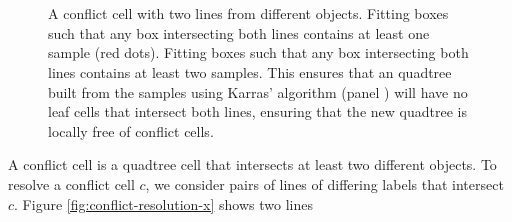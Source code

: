 \documentclass{egpubl}
\begin{document}
\begin{figure}
  \centering
   \\
   \\
  \caption{
    \protect{} A conflict cell with two lines from different objects.
    \protect{} Fitting boxes such that any box intersecting both lines contains at least one sample (red dots).
    \protect{} Fitting boxes such that any box intersecting both lines contains at least two samples. This ensures that an quadtree built from the samples using Karras' algorithm (panel \protect{}) will have no leaf cells that intersect both lines, ensuring that the new quadtree is locally free of conflict cells.
  }
  \label{fig:conflict-resolution}
\end{figure}



A conflict cell is a quadtree cell that intersects at least two different objects. To resolve a conflict cell $c$, we consider pairs of lines of differing labels that intersect $c$. Figure \ref{fig:conflict-resolution-x} shows two lines
\end{document}

